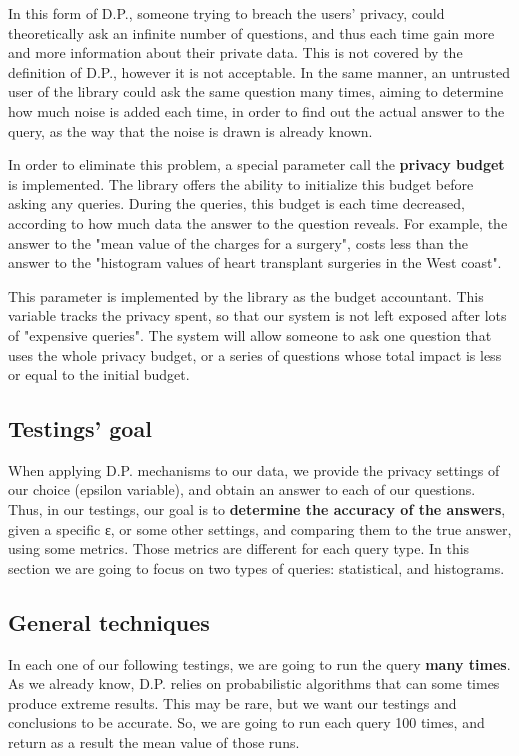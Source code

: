 In this form of D.P., someone trying to breach the users' privacy, could theoretically ask an infinite number of questions, and thus each time gain more and more information about their private data. This is not covered by the definition of D.P., however it is not acceptable. In the same manner, an untrusted user of the library could ask the same question many times, aiming to determine how much noise is added each time, in order to find out the actual answer to the query, as the way that the noise is drawn is already known.

In order to eliminate this problem, a special parameter call the \textbf{privacy budget} is implemented. The library offers the ability to initialize this budget before asking any queries. During the queries, this budget is each time decreased, according to how much data the answer to the question reveals. For example, the answer to the "mean value of the charges for a surgery", costs less than the answer to the "histogram values of heart transplant surgeries in the West coast".

This parameter is implemented by the library as the budget accountant. This variable tracks the privacy spent, so that our system is not left exposed after lots of "expensive queries". The system will allow someone to ask one question that uses the whole privacy budget, or a series of questions whose total impact is less or equal to the initial budget.

\subsection{Testings' goal}

When applying D.P. mechanisms to our data, we provide the privacy settings of our choice (epsilon variable), and obtain an answer to each of our questions. Thus, in our testings, our goal is to \textbf{determine the accuracy of the answers}, given a specific ε, or some other settings, and comparing them to the true answer, using some metrics. Those metrics are different for each query type. In this section we are going to focus on two types of queries: statistical, and histograms.

\subsection{General techniques}
In each one of our following testings, we are going to run the query \textbf{many times}. As we already know, D.P. relies on probabilistic algorithms that can some times produce extreme results. This may be rare, but we want our testings and conclusions to be accurate. So, we are going to run each query 100 times, and return as a result the mean value of those runs.

